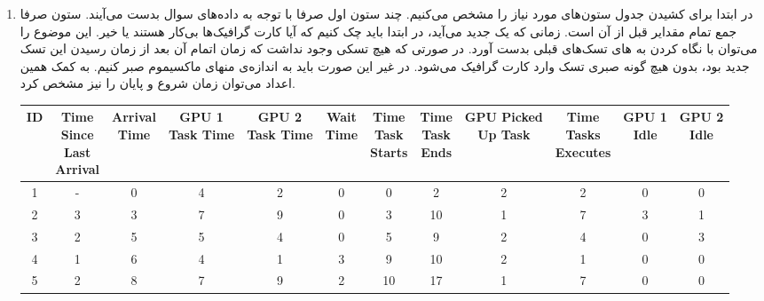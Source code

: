 \begin{enumerate}
    \item در ابتدا برای کشیدن جدول ستون‌های مورد نیاز را مشخص می‌کنیم.
    چند ستون اول صرفا با توجه به داده‌های سوال بدست می‌آیند. ستون
    صرفا جمع تمام مقدایر
    قبل از آن است.
    زمانی که یک
    جدید می‌آید، در ابتدا باید چک کنیم که آیا کارت گرافیک‌ها بی‌کار هستند یا خیر. این موضوع را می‌توان با نگاه
    کردن به
    های
    تسک‌های قبلی بدست آورد. در صورتی که هیچ تسکی وجود نداشت که زمان اتمام آن بعد از زمان رسیدن این تسک جدید بود،
    بدون هیچ گونه صبری تسک وارد کارت گرافیک می‌شود. در غیر این صورت باید به اندازه‌ی
    منهای ماکسیموم
    صبر کنیم. به کمک همین اعداد می‌توان زمان شروع و پایان را نیز مشخص کرد.
    \begin{latin}
        \centering
        \scriptsize
        \begin{tabular}{|c|c|c|c|c|c|c|c|c|c|c|c|}
        \hline
        ID & \makecell{Time\\Since\\Last\\Arrival} & \makecell{Arrival\\Time} & \makecell{GPU 1\\Task Time} & \makecell{GPU 2\\Task Time} & \makecell{Wait\\Time} & \makecell{Time\\Task\\Starts} & \makecell{Time\\Task\\Ends} & \makecell{GPU Picked\\Up Task} & \makecell{Time\\Tasks\\Executes} & \makecell{GPU 1\\Idle} & \makecell{GPU 2\\Idle}\\
        \hline
        1 & - & 0 & 4 & 2 & 0 & 0 & 2 & 2 & 2 & 0 & 0 \\
        \hline
        2 & 3 & 3 & 7 & 9 & 0 & 3 & 10 & 1 & 7 & 3 & 1 \\
        \hline
        3 & 2 & 5 & 5 & 4 & 0 & 5 & 9 & 2 & 4 & 0 & 3 \\
        \hline
        4 & 1 & 6 & 4 & 1 & 3 & 9 & 10 & 2 & 1 & 0 & 0 \\
        \hline
        5 & 2 & 8 & 7 & 9 & 2 & 10 & 17 & 1 & 7 & 0 & 0 \\

\end{tabular}
\end{latin}
\end{enumerate}
